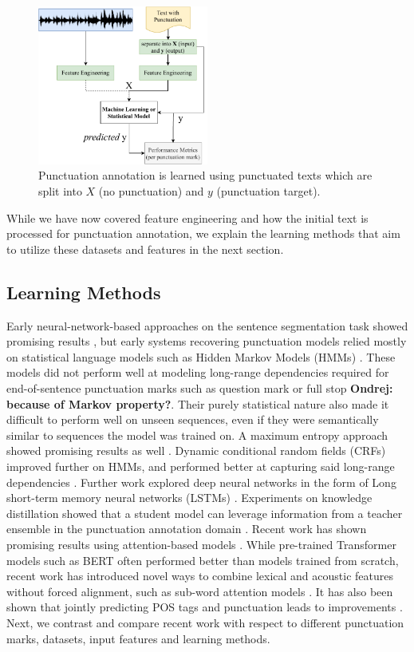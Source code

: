 \documentclass[bsc,deptreport,ai]{infthesis} %
\newcommand{\Ondrej}[1]{{\color{red} \textbf{Ondrej: #1}}}
\begin{document}
\begin{figure}[H]
\centering
\includegraphics[width=0.50\textwidth]{2_1_1.pdf}
\caption{Punctuation annotation is learned using punctuated texts which are split into $X$ (no punctuation) and $y$ (punctuation target).}
\label{fig:learn}
\end{figure}
While we have now covered feature engineering and how the initial text is processed for punctuation annotation, we explain the learning methods that aim to utilize these datasets and features in the next section.

\subsection{Learning Methods}
\label{sec:learning}

Early neural-network-based approaches on the sentence segmentation task showed promising results \citep{palmer1995satz}, but early systems recovering punctuation models relied mostly on statistical language models such as Hidden Markov Models (HMMs) \citep{beeferman1998,Chen1999,christensen2001,briscoe2002}. These models did not perform well at modeling long-range dependencies required for end-of-sentence punctuation marks such as question mark or full stop \citep{beeferman1998}\Ondrej{because of Markov property?}. Their purely statistical nature also made it difficult to perform well on unseen sequences, even if they were semantically similar to sequences the model was trained on. A maximum entropy approach showed promising results as well \citep{Huang2002}.
Dynamic conditional random fields (CRFs) improved further on HMMs, and performed better at capturing said long-range dependencies \citep{LuNg2010,wangngsim2012}.  Further work explored deep neural networks in the form of Long short-term memory neural networks (LSTMs) \citep{Tilk2015,Klejch2017}. Experiments on knowledge distillation showed that a student model can leverage information from a teacher ensemble in the punctuation annotation domain \citep{yitaowen2017}. Recent work has shown promising results using attention-based models \citep{yi2019speech2vec,sunkara2020}. While pre-trained Transformer models such as BERT \citep{devlin2018} often performed better than models trained from scratch, recent work has introduced novel ways to combine lexical and acoustic features without forced alignment, such as sub-word attention models \citep{sunkara2020}. It has also been shown that jointly predicting POS tags and punctuation leads to improvements \citep{yi2020adversarial}.
Next, we contrast and compare recent work with respect to different punctuation marks, datasets, input features and learning methods.
\end{document}
